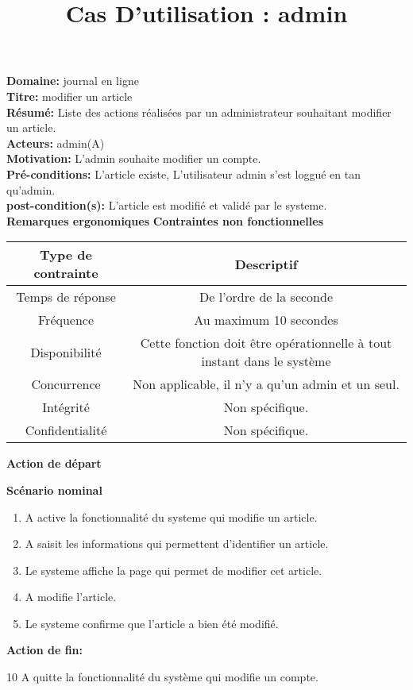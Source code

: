 \documentclass[a4paper,10pt]{article}
\title{Cas D'utilisation : admin}
\author{}
\begin{document}
\maketitle



\textbf{Domaine:} journal en ligne\\
\textbf{Titre:} modifier un article\\
\textbf{Résumé:} Liste des actions réalisées par un administrateur souhaitant modifier un article.\\
\textbf{Acteurs:} admin(A)\\
\textbf{Motivation:} L'admin souhaite modifier un compte.\\
\textbf{Pré-conditions:} L'article existe, L'utilisateur admin s'est loggué en tan qu'admin.\\
\textbf{post-condition(s):} L'article est modifié et validé par le systeme.\\



\textbf{Remarques ergonomiques}
\textbf{Contraintes non fonctionnelles}
\begin{center}
  \begin{tabular}{|c|c|}
\hline
   \textbf{Type de contrainte}&\textbf{Descriptif}\\
\hline
Temps de réponse&De l'ordre de la seconde\\
\hline
Fréquence & Au maximum 10 secondes\\
\hline
Disponibilité & Cette fonction doit être opérationnelle à tout instant dans le système\\
\hline
Concurrence&Non applicable, il n'y a qu'un admin et un seul.\\
\hline
Intégrité&Non spécifique.\\
\hline
Confidentialité& Non spécifique.\\
\hline

  \end{tabular}
\end{center}

\textbf{Action de départ}

\textbf{Scénario nominal}
\begin{enumerate}
\item A active la fonctionnalité du systeme qui modifie un article.
\item A saisit les informations qui permettent d'identifier un article.
\item Le systeme affiche la page qui permet de modifier cet article.
\item A modifie l'article.
\item Le systeme confirme que l'article a bien été modifié.
\end{enumerate}

\textbf{Action de fin:}

10 A quitte la fonctionnalité du système qui modifie un compte.
\end{document}
